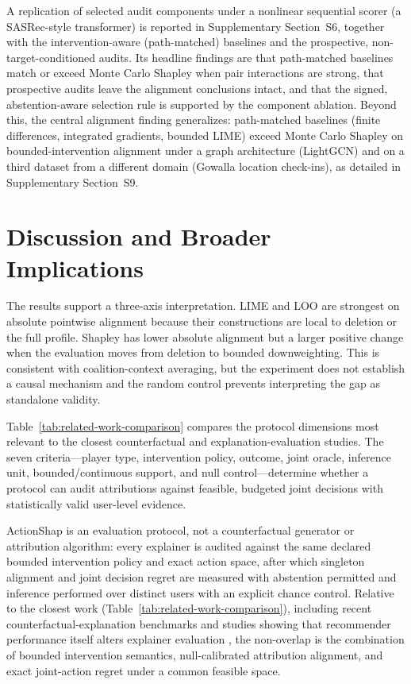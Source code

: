 \documentclass[manuscript,screen,review,anonymous]{acmart}
\begin{document}
A replication of selected audit components under a nonlinear sequential scorer (a SASRec-style transformer) is reported in Supplementary Section~S6, together with the intervention-aware (path-matched) baselines and the prospective, non-target-conditioned audits. Its headline findings are that path-matched baselines match or exceed Monte Carlo Shapley when pair interactions are strong, that prospective audits leave the alignment conclusions intact, and that the signed, abstention-aware selection rule is supported by the component ablation. Beyond this, the central alignment finding generalizes: path-matched baselines (finite differences, integrated gradients, bounded LIME) exceed Monte Carlo Shapley on bounded-intervention alignment under a graph architecture (LightGCN) and on a third dataset from a different domain (Gowalla location check-ins), as detailed in Supplementary Section~S9.

\FloatBarrier
\section{Discussion and Broader Implications}
The results support a three-axis interpretation. LIME and LOO are strongest on absolute pointwise alignment because their constructions are local to deletion or the full profile. Shapley has lower absolute alignment but a larger positive change when the evaluation moves from deletion to bounded downweighting. This is consistent with coalition-context averaging, but the experiment does not establish a causal mechanism and the random control prevents interpreting the gap as standalone validity.

Table~\ref{tab:related-work-comparison} compares the protocol dimensions most relevant to the closest counterfactual and explanation-evaluation studies. The seven criteria---player type, intervention policy, outcome, joint oracle, inference unit, bounded/continuous support, and null control---determine whether a protocol can audit attributions against feasible, budgeted joint decisions with statistically valid user-level evidence.

ActionShap is an evaluation protocol, not a counterfactual generator or attribution algorithm: every explainer is audited against the same declared bounded intervention policy and exact action space, after which singleton alignment and joint decision regret are measured with abstention permitted and inference performed over distinct users with an explicit chance control. Relative to the closest work (Table~\ref{tab:related-work-comparison}), including recent counterfactual-explanation benchmarks and studies showing that recommender performance itself alters explainer evaluation \citep{mohammadi2024recsys,nguyen2026}, the non-overlap is the combination of bounded intervention semantics, null-calibrated attribution alignment, and exact joint-action regret under a common feasible space.
\end{document}
